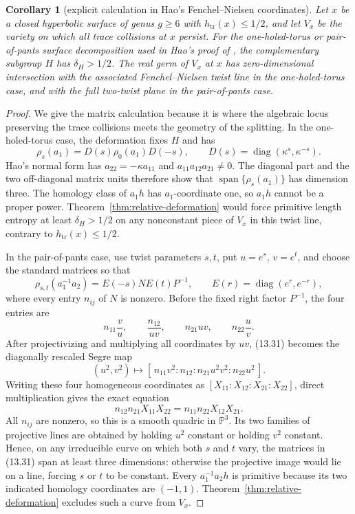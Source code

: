 \documentclass[11pt,reqno]{amsart}
\newtheorem{corollary}[theorem]{Corollary}
\theoremstyle{definition}
\theoremstyle{remark}
\newcommand{\Tr}{\operatorname{tr}}
\newcommand{\Span}{\operatorname{span}}
\newcommand{\diag}{\operatorname{diag}}
\begin{document}
\begin{corollary}[explicit calculation in Hao's Fenchel--Nielsen coordinates]
\label{cor:hao-transversality}
Let \(x\) be a closed hyperbolic surface of genus \(g\ge6\) with
\(h_{\Tr}(x)\le1/2\), and let \(V_x\) be the variety on which all trace
collisions at \(x\) persist.
For the one-holed-torus or pair-of-pants surface decomposition used in Hao's proof of
\cite[Theorem~A, Proposition~3.2, and (5.1)]{HaoLengthSets}, the complementary
subgroup \(H\) has
\(\delta_H>1/2\).  The real germ of \(V_x\) at \(x\) has
zero-dimensional intersection with the associated Fenchel--Nielsen twist
line in the one-holed-torus case, and with the full two-twist plane in the
pair-of-pants case.
\end{corollary}

\begin{proof}
We give the matrix calculation because it is where the algebraic locus
preserving the trace collisions meets the geometry of the splitting.  In the
one-holed-torus case, the deformation fixes \(H\) and has
\[
 \rho_s(a_1)=D(s)\rho_0(a_1)D(-s),\qquad
 D(s)=\diag(\kappa^s,\kappa^{-s}).
\]
Hao's normal form has
\(a_{22}=-\kappa a_{11}\) and
\(a_{11}a_{12}a_{21}\ne0\).  The diagonal part and the two off-diagonal
matrix units therefore show that
\(\Span\{\rho_s(a_1)\}\) has dimension three.  The homology class of
\(a_1h\) has \(a_1\)-coordinate one, so \(a_1h\) cannot be a proper power.
Theorem~\ref{thm:relative-deformation} would force primitive length entropy
at least \(\delta_H>1/2\) on any nonconstant piece of
\(V_x\) in this twist line, contrary to \(h_{\Tr}(x)\le1/2\).

In the pair-of-pants case, use twist parameters \(s,t\), put
\(u=e^s\), \(v=e^t\), and choose the standard matrices so that
\[
 \rho_{s,t}(a_1^{-1}a_2)=E(-s)NE(t)P^{-1},
 \qquad E(r)=\diag(e^r,e^{-r}),
\]
where every entry \(n_{ij}\) of \(N\) is nonzero.  Before the fixed right
factor \(P^{-1}\), the four entries are
\[
 n_{11}\frac vu,\qquad
 \frac{n_{12}}{uv},\qquad
 n_{21}uv,\qquad
 n_{22}\frac uv.
\tag{13.31}
\]
After projectivizing and multiplying all coordinates by \(uv\), (13.31)
becomes the diagonally rescaled Segre map
\[
 (u^2,v^2)\longmapsto
 [\,n_{11}v^2:n_{12}:n_{21}u^2v^2:n_{22}u^2\,].
\]
Writing these four homogeneous coordinates as
\([X_{11}:X_{12}:X_{21}:X_{22}]\), direct multiplication gives the exact
equation
\[
 n_{12}n_{21}X_{11}X_{22}
   =n_{11}n_{22}X_{12}X_{21}.
\]
All \(n_{ij}\) are nonzero, so this is a smooth quadric in
\(\mathbb P^3\).  Its two families of projective lines are obtained by
holding \(u^2\) constant or holding \(v^2\) constant.  Hence, on any
irreducible curve on which both \(s\) and \(t\) vary, the matrices in
(13.31) span at least three dimensions: otherwise the projective image
would lie on a line, forcing \(s\) or \(t\) to be constant.  Every
\(a_1^{-1}a_2h\) is primitive because its two indicated homology
coordinates are \((-1,1)\).  Theorem~\ref{thm:relative-deformation} excludes
such a curve from \(V_x\).


\end{proof}
\end{document}
